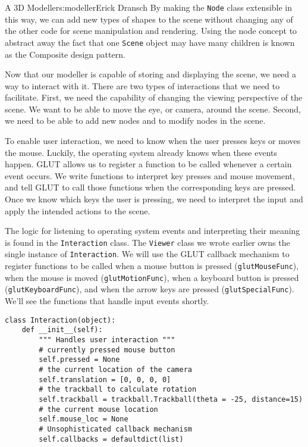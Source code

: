 \begin{aosachapter}{A 3D Modeller}{s:modeller}{Erick Dransch}
By making the \texttt{Node} class extensible in this way, we can add new
types of shapes to the scene without changing any of the other code for
scene manipulation and rendering. Using the node concept to abstract
away the fact that one \texttt{Scene} object may have many children is
known as the Composite design pattern.

\label{user-interaction}

Now that our modeller is capable of storing and displaying the scene, we
need a way to interact with it. There are two types of interactions that
we need to facilitate. First, we need the capability of changing the
viewing perspective of the scene. We want to be able to move the eye, or
camera, around the scene. Second, we need to be able to add new nodes
and to modify nodes in the scene.

To enable user interaction, we need to know when the user presses keys
or moves the mouse. Luckily, the operating system already knows when
these events happen. GLUT allows us to register a function to be called
whenever a certain event occurs. We write functions to interpret key
presses and mouse movement, and tell GLUT to call those functions when
the corresponding keys are pressed. Once we know which keys the user is
pressing, we need to interpret the input and apply the intended actions
to the scene.

The logic for listening to operating system events and interpreting
their meaning is found in the \texttt{Interaction} class. The
\texttt{Viewer} class we wrote earlier owns the single instance of
\texttt{Interaction}. We will use the GLUT callback mechanism to
register functions to be called when a mouse button is pressed
(\texttt{glutMouseFunc}), when the mouse is moved
(\texttt{glutMotionFunc}), when a keyboard button is pressed
(\texttt{glutKeyboardFunc}), and when the arrow keys are pressed
(\texttt{glutSpecialFunc}). We'll see the functions that handle input
events shortly.

\begin{verbatim}
class Interaction(object):
    def __init__(self):
        """ Handles user interaction """
        # currently pressed mouse button
        self.pressed = None
        # the current location of the camera
        self.translation = [0, 0, 0, 0]
        # the trackball to calculate rotation
        self.trackball = trackball.Trackball(theta = -25, distance=15)
        # the current mouse location
        self.mouse_loc = None
        # Unsophisticated callback mechanism
        self.callbacks = defaultdict(list)
        

\end{verbatim}
\end{aosachapter}
